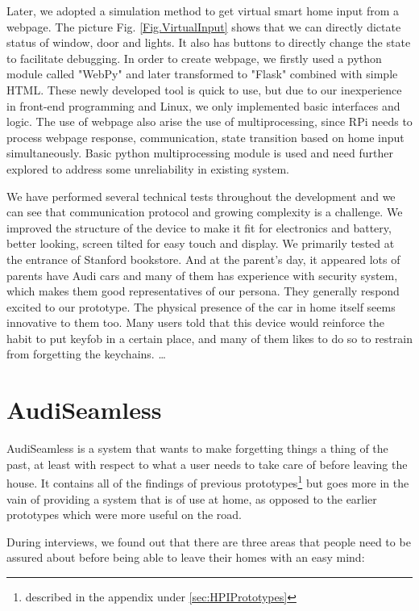 Later, we adopted a simulation method to get virtual smart home input from a webpage. The picture Fig. \ref{Fig.VirtualInput} shows that we can directly dictate status of window, door and lights. It also has buttons to directly change the state to facilitate debugging. In order to create webpage, we firstly used a python module called "WebPy" and later transformed to "Flask" combined with simple HTML. These newly developed tool is quick to use, but due to our inexperience in front-end programming and Linux, we only implemented basic interfaces and logic. The use of webpage also arise the use of multiprocessing, since RPi needs to process webpage response, communication, state transition based on home input simultaneously. Basic python multiprocessing module is used and need further explored to address some unreliability in existing system.

We have performed several technical tests throughout the development and we can see that communication protocol and growing complexity is a challenge. We improved the structure of the device to make it fit for electronics and battery, better looking, screen tilted for easy touch and display. We primarily tested at the entrance of Stanford bookstore. And at the parent's day, it appeared lots of parents have Audi cars and many of them has experience with security system, which makes them good representatives of our persona. They generally respond excited to our prototype. The physical presence of the car in home itself seems innovative to them too.  Many users told that this device would reinforce the habit to put keyfob in a certain place, and many of them likes to do so to restrain from forgetting the keychains. …

\section{AudiSeamless}

AudiSeamless is a system that wants to make forgetting things a thing of the past, at least with respect to what a user needs to take care of before leaving the house. It contains all of the findings of previous prototypes\footnote{described in the appendix under \ref{sec:HPIPrototypes}} but goes more in the vain of providing a system that is of use at home, as opposed to the earlier prototypes which were more useful on the road.

During interviews, we found out that there are three areas that people need to be assured about before being able to leave their homes with an easy mind:

